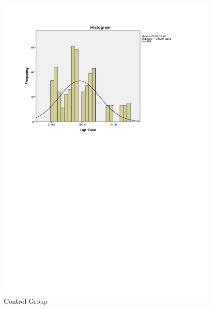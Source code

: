 \begin{figure}
	\centering
	\begin{minipage}{0.45\textwidth}
		\centering
		\includegraphics[width=\textwidth]{charts/4-0}
		Control Group
	\end{minipage}\hfill
	\begin{minipage}{0.45\textwidth}
		\centering

\end{minipage}
\end{figure}
